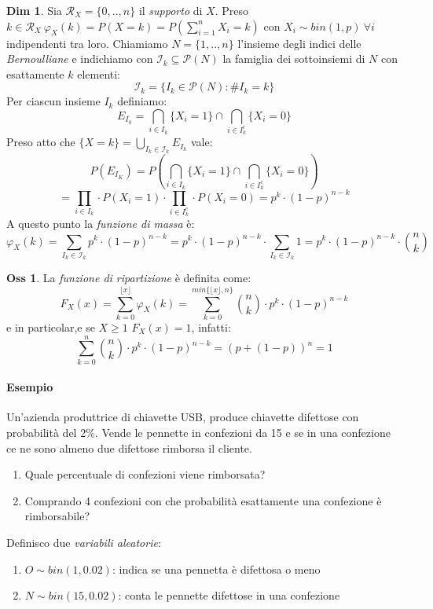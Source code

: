 \documentclass[12pt, a4paper]{report}
\theoremstyle{definition}
\newtheorem*{demonstration}{Dim}
\newtheorem*{observation}{Oss}
\DeclareRobustCommand{\supp}{\mathcal{R}}%
\begin{document}
\begin{demonstration}
	Sia \(\supp_X=\{0,..,n\}\) il \emph{supporto} di $X$. Preso \(k\in\supp_X\
	\varphi_X(k)=P(X=k)=P(\sum_{i=1}^nX_i=k)\) con \(X_i\sim bin(1,p)\ \forall i\)
	indipendenti tra loro. Chiamiamo $N=\{1,..,n\}$ l'insieme degli indici delle
	\emph{Bernoulliane} e indichiamo con \(\mathcal{I}_k\subseteq\mathcal{P}(N)\)
	la famiglia dei sottoinsiemi di $N$ con esattamente $k$ elementi:
	\[\mathcal{I}_k=\{I_k\in\mathcal{P}(N):\#I_k=k\}\]
	Per ciascun insieme $I_k$ definiamo:
	\[E_{I_k}=\bigcap_{i\in I_k}\{X_i=1\}\cap\bigcap_{i\in I_k^c}\{X_i=0\}\]
	Preso atto che \(\{X=k\}=\bigcup_{I_k\in\mathcal{I}_k}E_{I_k}\) vale:
	\[P(E_{I_K})=P\left(\bigcap_{i\in I_k}\{X_i=1\}\cap\bigcap_{i\in I_k^c}
	\{X_i=0\}\right)\]
	\[=\prod_{i\in I_k}\cdot P(X_i=1)\cdot \prod_{i\in I_k^c}\cdot P(X_i=0)=p^k\cdot (1-p)^{n-k}\]
	A questo punto la \emph{funzione di massa} è:
	\[\varphi_X(k)=\sum_{I_k\in\mathcal{I}_k}p^k\cdot (1-p)^{n-k}=p^k\cdot (1-p)^{n-k}\cdot 
	\sum_{I_k\in\mathcal{I}_k}1=p^k\cdot (1-p)^{n-k}\cdot \binom{n}{k}\]
\end{demonstration}

\begin{observation}
	La \emph{funzione di ripartizione} è definita come:
	\[F_X(x)=\sum_{k=0}^{\lfloor x\rfloor}\varphi_X(k)=\sum_{k=0}^{min\{\lfloor
	x\rfloor,n\}}\binom{n}{k}\cdot p^k\cdot (1-p)^{n-k}\]
	e in particolar,e se $X\geq 1$ \(F_X(x)=1\), infatti:
	\[\sum_{k=0}^n\binom{n}{k}\cdot p^k\cdot (1-p)^{n-k}=(p+(1-p))^n=1\]
\end{observation}

\paragraph*{Esempio}
Un'azienda produttrice di chiavette USB, produce chiavette difettose con probabilità
del 2\%. Vende le pennette in confezioni da 15 e se in una confezione ce ne sono
almeno due difettose rimborsa il cliente.
\begin{enumerate}
	\item Quale percentuale di confezioni viene rimborsata?
	\item Comprando 4 confezioni con che probabilità esattamente una confezione
	è rimborsabile?
\end{enumerate}

Definisco due \emph{variabili aleatorie}:
\begin{enumerate}[label=(\roman*)]
	\item $O\sim bin(1,0.02)$: indica se una pennetta è difettosa o meno
	\item $N\sim bin(15,0.02)$: conta le pennette difettose in una confezione
\end{enumerate}
\end{document}
